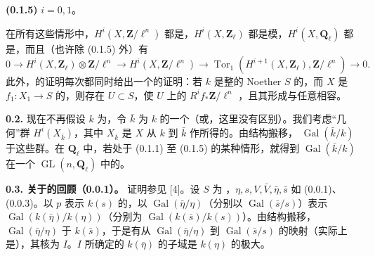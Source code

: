\textbf{(0.1.5)} $i=0,1$。

在所有这些情形中，$H^i(X,\mathbf Z/\ell^n)$ 都是，$H^i(X,\mathbf Z_\ell)$ 都是模，$H^i(X,\mathbf Q_\ell)$ 都是，而且（也许除 (0.1.5) 外）有
\[
0\longrightarrow H^i(X,\mathbf Z_\ell)\otimes\mathbf Z/\ell^n
\longrightarrow H^i(X,\mathbf Z/\ell^n)
\longrightarrow\operatorname{Tor}_1(H^{i+1}(X,\mathbf Z_\ell),\mathbf Z/\ell^n)
\longrightarrow0.
\]
此外，的证明每次都同时给出一个的证明：若 $k$ 是整的 Noether  $S$ 的，而 $X$ 是 $f_1:X_1\to S$ 的，则存在 $U\subset S$，使 $U$ 上的 $R^if_*\mathbf Z/\ell^n$ ，且其形成与任意相容。

\textbf{0.2.} 现在不再假设 $k$ 为，令 $\bar k$ 为 $k$ 的一个（或，这里没有区别）。我们考虑“几何”群 $H^i(X_{\bar k})$，其中 $X_{\bar k}$ 是 $X$ 从 $k$ 到 $\bar k$ 作所得的。由结构搬移， $\operatorname{Gal}(\bar k/k)$ 于这些群。在 $\mathbf Q_\ell$ 中，若处于 (0.1.1) 至 (0.1.5) 的某种情形，就得到 $\operatorname{Gal}(\bar k/k)$ 在一个 $\operatorname{GL}(n,\mathbf Q_\ell)$ 中的。

\textbf{0.3. 关于的回顾（0.0.1）。}
证明参见 [4]。设 $S$ 为 ，$\eta,s,V,\bar V,\bar\eta,\bar s$ 如 (0.0.1)、(0.0.3)。以 $p$ 表示 $k(s)$ 的，以 $\operatorname{Gal}(\bar\eta/\eta)$（分别以 $\operatorname{Gal}(\bar s/s)$）表示  $\operatorname{Gal}(k(\bar\eta)/k(\eta))$（分别为 $\operatorname{Gal}(k(\bar s)/k(s))$）。由结构搬移，$\operatorname{Gal}(\bar\eta/\eta)$ 于 $k(\bar s)$，于是有从 $\operatorname{Gal}(\bar\eta/\eta)$ 到 $\operatorname{Gal}(\bar s/s)$ 的映射（实际上是），其核为 $I$。$I$ 所确定的 $k(\bar\eta)$ 的子域是 $k(\eta)$ 的极大。

